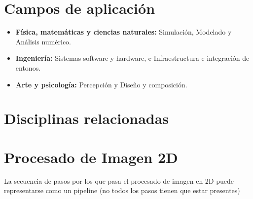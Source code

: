 \section{Campos de aplicación}\label{sec:campos-de-aplicación}
\begin{itemize}
	\item \textbf{Física, matemáticas y ciencias naturales:} Simulación, Modelado y Análisis numérico.
	\item \textbf{Ingeniería:} Sistemas software y hardware, e Infraestructura e integración de entonos.
	\item \textbf{Arte y psicología:} Percepción y Diseño y composición.
\end{itemize}

\section{Disciplinas relacionadas}\label{sec:disciplinas-relacionadas}
\begin{figure}[H]
	{\def\svgwidth{.8\textwidth}
		}
\end{figure}

\section{Procesado de Imagen 2D}\label{sec:procesado-de-imagen-2d}
La secuencia de pasos por los que pasa el procesado de imagen en 2D puede representarse como un pipeline (no todos los pasos tienen que estar presentes)
\begin{figure}[H]
	{\def\svgwidth{.8\textwidth}
		}
\end{figure}

